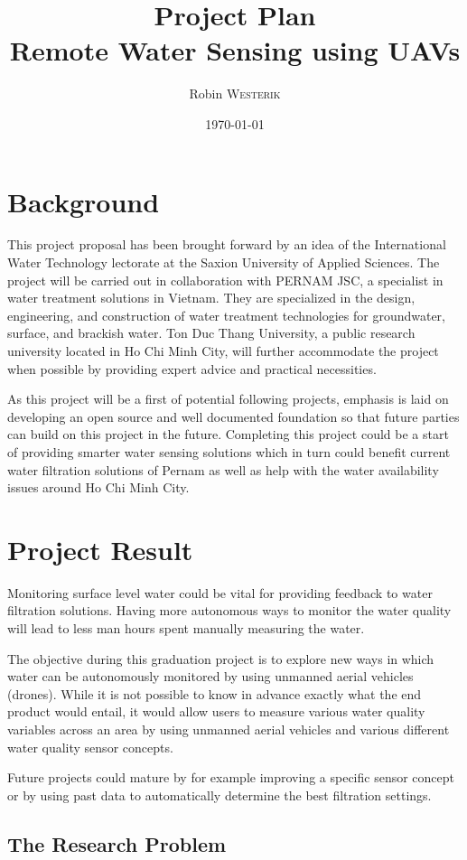 \documentclass[11pt, a4paper]{article}
\title{Project Plan\\Remote Water Sensing using UAVs}
\author{Robin \textsc{Westerik}}
\date{\today}
\begin{document}


\tableofcontents
\pagebreak

\section{Background}
This project proposal has been brought forward by an idea of the International Water Technology lectorate at the Saxion University of Applied Sciences. The project will be carried out in collaboration with PERNAM JSC, a specialist in water treatment solutions in Vietnam. They are specialized in the design, engineering, and construction of water treatment technologies for groundwater, surface, and brackish water. Ton Duc Thang University, a public research university located in Ho Chi Minh City, will further accommodate the project when possible by providing expert advice and practical necessities. 

As this project will be a first of potential following projects, emphasis is laid on developing an open source and well documented foundation so that future parties can build on this project in the future. Completing this project could be a start of providing smarter water sensing solutions which in turn could benefit current water filtration solutions of Pernam as well as help with the water availability issues around Ho Chi Minh City.

\section{Project Result}
Monitoring surface level water could be vital for providing feedback to water filtration solutions. Having more autonomous ways to monitor the water quality will lead to less man hours spent manually measuring the water.

The objective during this graduation project is to explore new ways in which water can be autonomously monitored by using unmanned aerial vehicles (drones). While it is not possible to know in advance exactly what the end product would entail, it would allow users to measure various water quality variables across an area by using unmanned aerial vehicles and various different water quality sensor concepts.

Future projects could mature by for example improving a specific sensor concept or by using past data to automatically determine the best filtration settings.

\subsection{The Research Problem}
\end{document}
